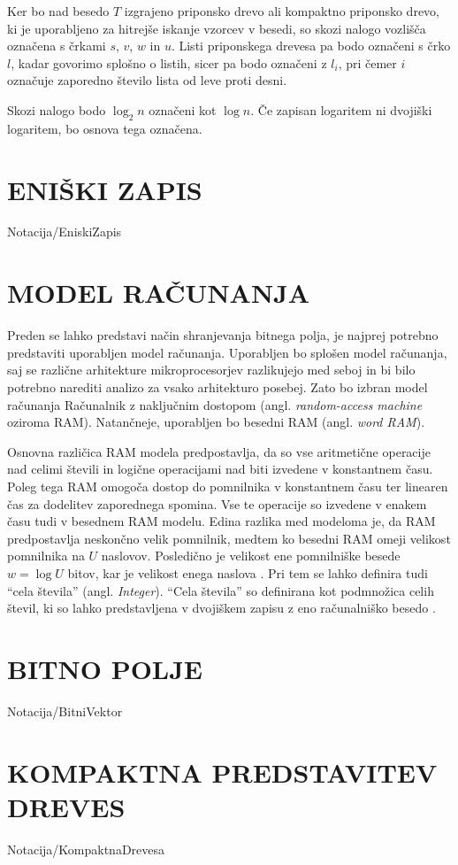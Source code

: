 Ker bo nad besedo $T$ izgrajeno priponsko drevo ali kompaktno priponsko drevo, ki je uporabljeno za hitrejše iskanje vzorcev v besedi, so skozi nalogo vozlišča označena s črkami $s$, $v$, $w$ in $u$. Listi priponskega drevesa pa bodo označeni s črko $l$, kadar govorimo splošno o listih, sicer pa bodo označeni z $l_i$, pri čemer $i$ označuje zaporedno število lista od leve proti desni.

Skozi nalogo bodo $\log_2{n}$ označeni kot $\log{n}$. Če zapisan logaritem ni dvojiški logaritem, bo osnova tega označena.


\section{ENIŠKI ZAPIS}\label{sec:Eniski_Zapis}
{Notacija/EniskiZapis}

\section{MODEL RAČUNANJA}\label{sec:Model_racunanja}
Preden se lahko predstavi način shranjevanja bitnega polja, je najprej potrebno predstaviti uporabljen model računanja. Uporabljen bo splošen model računanja, saj se različne arhitekture mikroprocesorjev razlikujejo med seboj in bi bilo potrebno narediti analizo za vsako arhitekturo posebej. Zato bo izbran model računanja Računalnik z naključnim dostopom (angl. \textit{random-access machine} oziroma RAM). Natančneje, uporabljen bo besedni RAM (angl. \textit{word RAM}).

Osnovna različica RAM modela predpostavlja, da so vse aritmetične operacije nad celimi števili in logične operacijami nad biti izvedene v konstantnem času. Poleg tega RAM omogoča dostop do pomnilnika v konstantnem času ter linearen čas za dodelitev zaporednega spomina. Vse te operacije so izvedene v enakem času tudi v besednem RAM modelu. Edina razlika med modeloma je, da RAM predpostavlja neskončno velik pomnilnik, medtem ko besedni RAM omeji velikost pomnilnika na $U$ naslovov. Posledično je velikost ene pomnilniške besede $w=\log{U}$ bitov, kar je velikost enega naslova \cite{Fredman1990,Morin2013,Navarro2016}. Pri tem se lahko definira tudi \enquote{cela števila} (angl. \textit{Integer}). \enquote{Cela števila} so definirana kot podmnožica celih števil, ki so lahko predstavljena v dvojiškem zapisu z eno računalniško besedo \cite{Navarro2016}.

\section{BITNO POLJE}\label{sec:Bitno_Polje}
{Notacija/BitniVektor}


\section{KOMPAKTNA PREDSTAVITEV DREVES}\label{sec:kompaktna_drevesa}
{Notacija/KompaktnaDrevesa}